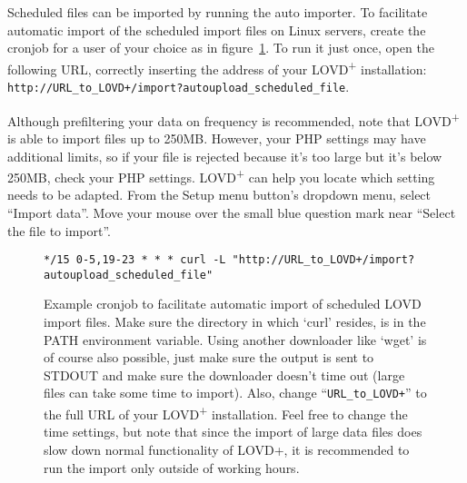 Scheduled files can be imported by running the auto importer.
To facilitate automatic import of the scheduled import files on Linux servers,
 create the cronjob for a user of your choice as in figure~\ref{fig:import_import_cronjob}.
To run it just once, open the following URL, correctly inserting the address of your LOVD\textsuperscript{+}
 installation: \texttt{http://URL\_to\_LOVD+/import?autoupload\_scheduled\_file}.

\begin{infotable}
Although prefiltering your data on frequency is recommended, note that LOVD\textsuperscript{+}
 is able to import files up to 250MB.
However, your PHP settings may have additional limits, so if your file is rejected
 because it's too large but it's below 250MB, check your PHP settings.
LOVD\textsuperscript{+} can help you locate which setting needs to be adapted.
From the Setup menu button's dropdown menu, select ``Import data''.
Move your mouse over the small blue question mark near ``Select the file to import''.
\end{infotable}

\begin{figure}[ht]
  \begin{shaded}
  \small
\begin{verbatim}
*/15 0-5,19-23 * * * curl -L "http://URL_to_LOVD+/import?autoupload_scheduled_file"
\end{verbatim}
  \caption{%
    Example cronjob to facilitate automatic import of scheduled LOVD import files.
    Make sure the directory in which `curl' resides, is in the PATH environment variable.
    Using another downloader like `wget' is of course also possible, just make sure the output is sent to STDOUT and
     make sure the downloader doesn't time out (large files can take some time to import).
    Also, change ``\texttt{URL\_to\_LOVD+}'' to the full URL of your LOVD\textsuperscript{+} installation.
    Feel free to change the time settings, but note that since the import of large data files does slow down normal
     functionality of LOVD+, it is recommended to run the import only outside of working hours.}
    \label{fig:import_import_cronjob}
  \end{shaded}
\end{figure}
\clearpage %





